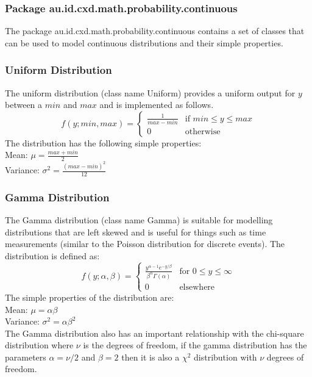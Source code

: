 \documentclass[a4paper]{article}
\begin{document}
\subsubsection*{Package au.id.cxd.math.probability.continuous}

The package au.id.cxd.math.probability.continuous contains a set of classes that can be used to model continuous distributions and their simple properties.

\subsubsection*{Uniform Distribution}

The uniform distribution (class name Uniform) provides a uniform output for $y$ between a $min$ and $max$ and is implemented as follows.
\[
f(y; min, max) = 
	\begin{cases}
		\frac{1}{max - min} & \text{if } min \le y \le max \\
		0 & \text{otherwise}
		
	\end{cases}
\]
The distribution has the following simple properties:\\
Mean: $\mu = \frac{max + min}{2}$\\
Variance: $\sigma^2 = \frac{(max - min)^2}{12}$

\subsubsection*{Gamma Distribution}
The Gamma distribution (class name Gamma) is suitable for modelling distributions that are left skewed and is useful for things such as time measurements (similar to the Poisson distribution for discrete events). The distribution is defined as:
\[
f(y; \alpha, \beta) = 
	\begin{cases}
		\frac{ y^{\alpha - 1}e^{-y/\beta} }{ \beta^{\alpha} \Gamma(\alpha) } & \text{for } 0 \le y \le \infty \\
		0 & \text{elsewhere}
	\end{cases}
\]
The simple properties of the distribution are:\\
Mean: $\mu = \alpha\beta$\\
Variance: $\sigma^2 = \alpha\beta^2$\\
The Gamma distribution also has an important relationship with the chi-square distribution where $\nu$ is the degrees of freedom, if the gamma distribution has the parameters $\alpha = \nu/2$ and $\beta = 2$ then it is also a $\chi^2$ distribution with $\nu$ degrees of freedom. \\
\end{document}
